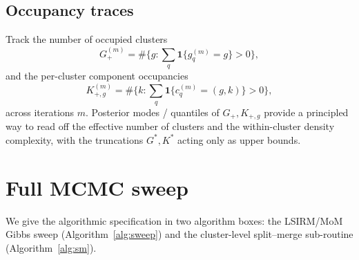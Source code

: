 \documentclass[11pt]{article}
\newcommand{\ind}{\mathbf{1}}
\begin{document}
\subsection{Occupancy traces}

Track the number of occupied clusters
\begin{equation}
G_+^{(m)} = \#\{g:\sum_q\ind\{g_q^{(m)}=g\}>0\},
\label{eq:Gplus}
\end{equation}
and the per-cluster component occupancies
\begin{equation}
K_{+,g}^{(m)} = \#\{k:\sum_q\ind\{c_q^{(m)}=(g,k)\}>0\},
\label{eq:Kplus}
\end{equation}
across iterations $m$. Posterior modes / quantiles of $G_+,K_{+,g}$
provide a principled way to read off the effective number of clusters
and the within-cluster density complexity, with the truncations
$G^*,K^*$ acting only as upper bounds.

\section{Full MCMC sweep}
\label{sec:sweep}

We give the algorithmic specification in two algorithm boxes:
the LSIRM/MoM Gibbs sweep (Algorithm~\ref{alg:sweep}) and the cluster-level
split--merge sub-routine (Algorithm~\ref{alg:sm}).
\end{document}
